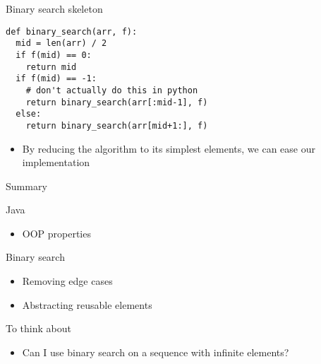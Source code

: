 \documentclass[presentation]{beamer}
\begin{document}
\begin{frame}[label={sec:org2fa9c4a},fragile]{Binary search skeleton}
 \begin{verbatim}
def binary_search(arr, f):
  mid = len(arr) / 2
  if f(mid) == 0:
    return mid
  if f(mid) == -1:
    # don't actually do this in python
    return binary_search(arr[:mid-1], f)
  else:
    return binary_search(arr[mid+1:], f)
\end{verbatim}
\begin{itemize}
\item By reducing the algorithm to its simplest elements, we can ease
our implementation
\end{itemize}
\end{frame}
\begin{frame}[label={sec:orgd22bc26}]{Summary}
\begin{block}{Java}
\begin{itemize}
\item OOP properties
\end{itemize}
\end{block}
\begin{block}{Binary search}
\begin{itemize}
\item Removing edge cases
\item Abstracting reusable elements
\end{itemize}
\end{block}
\begin{block}{To think about}
\begin{itemize}
\item Can I use binary search on a sequence with infinite elements?
\end{itemize}
\end{block}
\end{frame}
\end{document}
